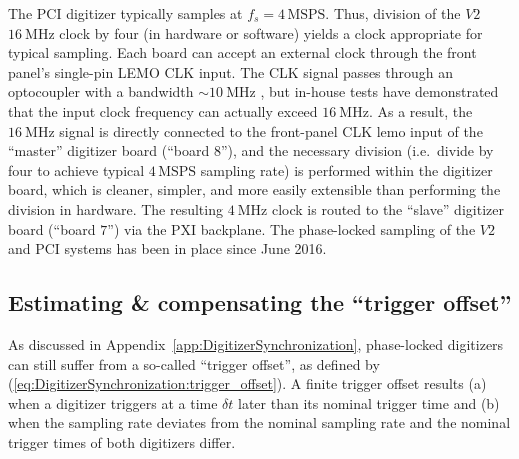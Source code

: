 The PCI digitizer typically samples at $f_s = 4 \, \text{MSPS}$.
Thus, division of the $V2$ $\SI{16}{\mega\hertz}$ clock by four
(in hardware or software) yields a clock appropriate for typical sampling.
Each board can accept an external clock
through the front panel's single-pin LEMO CLK input.
The CLK signal passes through an optocoupler
with a bandwidth $\sim \SI{10}{\mega\hertz}$
\cite{milne_optocoupler_pc16}, but
in-house tests have demonstrated
that the input clock frequency
can actually exceed $\SI{16}{\mega\hertz}$.
As a result, the $\SI{16}{\mega\hertz}$ signal
is directly connected to the front-panel CLK lemo input
of the ``master'' digitizer board (``board $8$''), and
the necessary division
(i.e.\ divide by four to achieve typical $4 \, \text{MSPS}$ sampling rate)
is performed within the digitizer board,
which is cleaner, simpler, and more easily extensible
than performing the division in hardware.
The resulting $\SI{4}{\mega\hertz}$ clock
is routed to the ``slave'' digitizer board (``board $7$'')
via the PXI backplane.
The phase-locked sampling of the $V2$ and PCI systems
has been in place since June 2016.


\subsection{Estimating \& compensating the ``trigger offset''}
As discussed in Appendix~\ref{app:DigitizerSynchronization},
phase-locked digitizers can still suffer from
a so-called ``trigger offset'', as defined by
(\ref{eq:DigitizerSynchronization:trigger_offset}).
A finite trigger offset results
(a) when a digitizer triggers at a time $\delta t$ later
than its nominal trigger time and
(b) when the sampling rate deviates from the nominal sampling rate
and the nominal trigger times of both digitizers differ.

